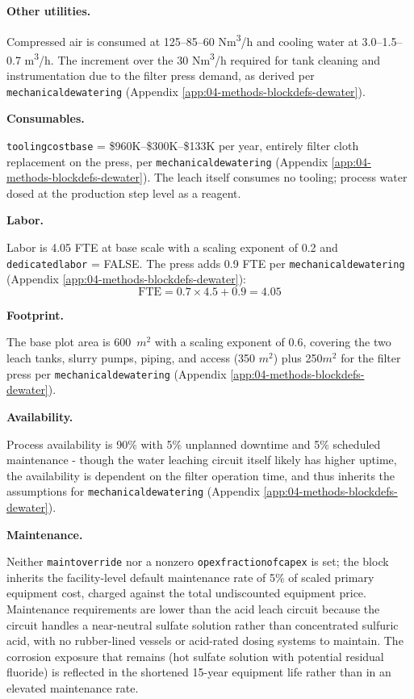 \documentclass{article}
\renewcommand\_{\textunderscore\allowbreak}
\begin{document}
\medskip
\noindent\textbf{Other utilities.}\quad

Compressed air is consumed at 125--85--60 \si{Nm^3/h} and cooling water at 3.0--1.5--0.7 \si{m^3/h}. The increment over the 30 \si{Nm^3/h} required for tank cleaning and instrumentation due to the filter press demand, as derived per \texttt{mechanical\_dewatering} (Appendix \ref{app:04-methods-blockdefs-dewater}).

\medskip
\noindent\textbf{Consumables.}\quad

\texttt{tooling\_cost\_base} = \$960K--\$300K--\$133K per year, entirely filter cloth replacement on the press, per \texttt{mechanical\_dewatering} (Appendix \ref{app:04-methods-blockdefs-dewater}). The leach itself consumes no tooling; process water dosed at the production step level as a reagent.

\medskip
\noindent\textbf{Labor.}\quad

Labor is 4.05 FTE at base scale with a scaling exponent of 0.2 and \texttt{dedicated\_labor} = FALSE. The press adds 0.9 FTE per \texttt{mechanical\_dewatering} (Appendix \ref{app:04-methods-blockdefs-dewater}):
\[
	\text{FTE} = 0.7 \times 4.5 + 0.9 = 4.05
\]

\medskip
\noindent\textbf{Footprint.}\quad

The base plot area is 600~$\si{m^2}$ with a scaling exponent of 0.6, covering the two leach tanks, slurry pumps, piping, and access (350 $\si{m^2}$) plus 250$\si{m^2}$ for the filter press per \texttt{mechanical\_dewatering} (Appendix \ref{app:04-methods-blockdefs-dewater}).

\medskip
\noindent\textbf{Availability.}\quad

Process availability is 90\% with 5\% unplanned downtime and 5\% scheduled maintenance - though the water leaching circuit itself likely has higher uptime, the availability is dependent on the filter operation time, and thus inherits the assumptions for \texttt{mechanical\_dewatering} (Appendix \ref{app:04-methods-blockdefs-dewater}).

\medskip
\noindent\textbf{Maintenance.}\quad

Neither \texttt{maint\_override} nor a nonzero \texttt{opex\_fraction\_of\_capex} is set; the block inherits the facility-level default maintenance rate of 5\% of scaled primary equipment cost, charged against the total undiscounted equipment price. Maintenance requirements are lower than the acid leach circuit because the circuit handles a near-neutral sulfate solution rather than concentrated sulfuric acid, with no rubber-lined vessels or acid-rated dosing systems to maintain. The corrosion exposure that remains (hot sulfate solution with potential residual fluoride) is reflected in the shortened 15-year equipment life rather than in an elevated maintenance rate.
\end{document}
